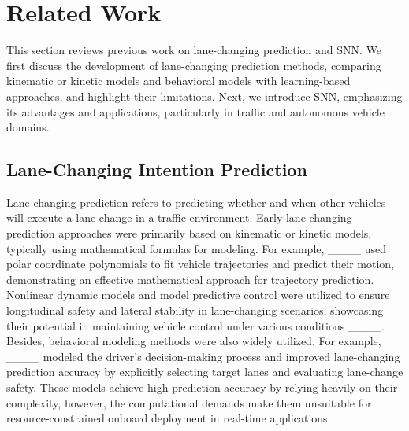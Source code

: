 \section{Related Work}
This section reviews previous work on lane-changing prediction and SNN. We first discuss the development of lane-changing prediction methods, comparing kinematic or kinetic models and behavioral models with learning-based approaches, and highlight their limitations. Next, we introduce SNN, emphasizing its advantages and applications, particularly in traffic and autonomous vehicle domains.
\subsection{Lane-Changing Intention Prediction}
Lane-changing prediction refers to predicting whether and when other vehicles will execute a lane change in a traffic environment.
Early lane-changing prediction approaches were primarily based on kinematic or kinetic models, typically using mathematical formulas for modeling. For example, ____ used polar coordinate polynomials to fit vehicle trajectories and predict their motion, demonstrating an effective mathematical approach for trajectory prediction. Nonlinear dynamic models and model predictive control were utilized to ensure longitudinal safety and lateral stability in lane-changing scenarios, showcasing their potential in maintaining vehicle control under various conditions ____.
Besides, behavioral modeling methods were also widely utilized. For example, ____ modeled the driver’s decision-making process and improved lane-changing prediction accuracy by explicitly selecting target lanes and evaluating lane-change safety.
These models achieve high prediction accuracy by relying heavily on their complexity, however, the computational demands make them unsuitable for resource-constrained onboard deployment in real-time applications.
